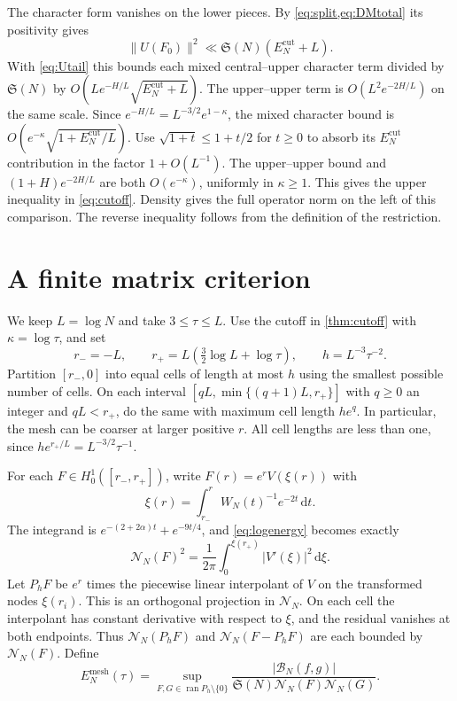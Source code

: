\documentclass[11pt,a4paper]{article}
\numberwithin{equation}{section}
\newcommand{\SSS}{\mathfrak S}
\newcommand{\ud}{\mathrm d}
\newcommand{\B}{\mathcal B_N}
\newcommand{\NN}{\mathcal N_N}
\begin{document}
The character form vanishes on the lower pieces. By
\cref{eq:split,eq:DMtotal} its positivity gives
\[
  \|U(F_0)\|^2\ll \SSS(N)(E_N^{\mathrm{cut}}+L).
\]
With \cref{eq:Utail} this bounds each mixed central--upper character
term divided by $\SSS(N)$ by
$O(L e^{-H/L}\sqrt{E_N^{\mathrm{cut}}+L})$.
The upper--upper term is $O(L^2e^{-2H/L})$ on the same scale.
Since $e^{-H/L}=L^{-3/2}e^{1-\kappa}$, the mixed character bound
is $O(e^{-\kappa}\sqrt{1+E_N^{\mathrm{cut}}/L})$.
Use $\sqrt{1+t}\le1+t/2$ for $t\ge0$ to absorb its
$E_N^{\mathrm{cut}}$ contribution in the factor $1+O(L^{-1})$.
The upper--upper bound and $(1+H)e^{-2H/L}$ are both $O(e^{-\kappa})$,
uniformly in $\kappa\ge1$. This gives the upper inequality
in \cref{eq:cutoff}. Density gives the full
operator norm on the left of this comparison. The reverse
inequality follows from the definition of the restriction.

\section{A finite matrix criterion}
\label{sec:mesh}

We keep $L=\log N$ and take $3\le \tau\le L$. Use the cutoff in
\cref{thm:cutoff} with $\kappa=\log\tau$, and set
\begin{equation}
 r_-=-L,\qquad r_+=L(\tfrac32\log L+\log\tau),
 \qquad h=L^{-3}\tau^{-2}.
 \label{eq:grid}
\end{equation}
Partition $[r_-,0]$ into equal cells of length at most $h$ using
the smallest possible number of cells. On each interval
$[qL,\min\{(q+1)L,r_+\}]$ with $q\ge0$ an integer and $qL<r_+$,
do the same with maximum cell length $he^q$. In particular, the
mesh can be coarser at larger positive $r$. All cell lengths are
less than one, since $he^{r_+/L}=L^{-3/2}\tau^{-1}$.

For each $F\in H^1_0([r_-,r_+])$, write $F(r)=e^r V(\xi(r))$ with
\begin{equation}
 \xi(r)=\int_{r_-}^r W_N(t)^{-1}e^{-2t}\,\ud t.
 \label{eq:exactcoord}
\end{equation}
The integrand is $e^{-(2+2\alpha)t}+e^{-9t/4}$, and
\cref{eq:logenergy} becomes exactly
\begin{equation}
 \NN(F)^2=\frac1{2\pi}\int_0^{\xi(r_+)} |V'(\xi)|^2\,\ud\xi.
 \label{eq:exactdirichlet}
\end{equation}
Let $P_hF$ be $e^r$ times the piecewise linear interpolant of $V$
on the transformed nodes $\xi(r_i)$. This is an orthogonal projection
in $\NN$. On each cell the interpolant has constant derivative with
respect to $\xi$, and the residual vanishes at both endpoints.
Thus $\NN(P_hF)$ and $\NN(F-P_hF)$ are each bounded by $\NN(F)$.
Define
\[
 E_N^{\mathrm{mesh}}(\tau)
 =\sup_{F,G\in\operatorname{ran}P_h\setminus\{0\}}
   \frac{|\B(f,g)|}{\SSS(N)\NN(F)\NN(G)}.
\]
\end{document}
